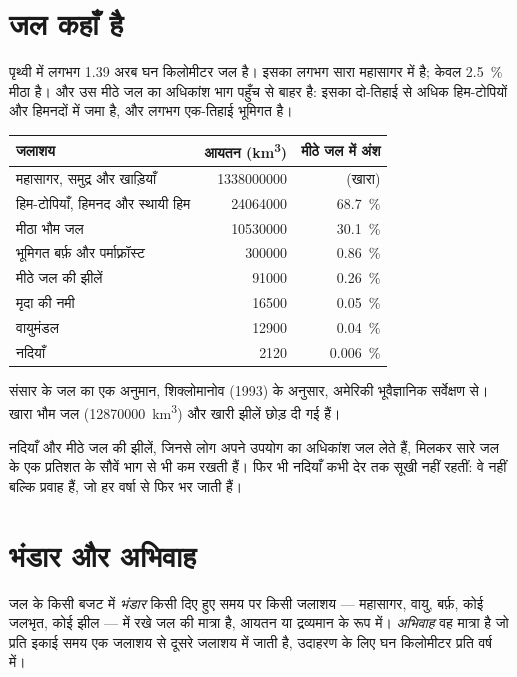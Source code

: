 \section{जल कहाँ है}

पृथ्वी में लगभग 1.39 अरब घन किलोमीटर जल है। इसका लगभग सारा
महासागर में है; केवल \qty{2.5}{\percent} मीठा है। और उस मीठे
जल का अधिकांश भाग पहुँच से बाहर है: इसका दो-तिहाई से अधिक हिम-टोपियों
और हिमनदों में जमा है, और लगभग एक-तिहाई भूमिगत है।

\begin{center}
\small
\begin{tabular}{|l|r|r|}
\hline
\textbf{जलाशय} & \textbf{आयतन (\unit{km^3})} & \textbf{मीठे जल में अंश} \\ \hline
महासागर, समुद्र और खाड़ियाँ & \num{1338000000} & (खारा) \\ \hline
हिम-टोपियाँ, हिमनद और स्थायी हिम & \num{24064000} & \qty{68.7}{\percent} \\ \hline
मीठा भौम जल & \num{10530000} & \qty{30.1}{\percent} \\ \hline
भूमिगत बर्फ़ और पर्माफ़्रॉस्ट & \num{300000} & \qty{0.86}{\percent} \\ \hline
मीठे जल की झीलें & \num{91000} & \qty{0.26}{\percent} \\ \hline
मृदा की नमी & \num{16500} & \qty{0.05}{\percent} \\ \hline
वायुमंडल & \num{12900} & \qty{0.04}{\percent} \\ \hline
नदियाँ & \num{2120} & \qty{0.006}{\percent} \\ \hline
\end{tabular}

{\small संसार के जल का एक अनुमान, शिक्लोमानोव (1993) के अनुसार, अमेरिकी
भूवैज्ञानिक सर्वेक्षण से। खारा भौम जल (\num{12870000}~\unit{km^3}) और
खारी झीलें छोड़ दी गई हैं।}
\end{center}

नदियाँ और मीठे जल की झीलें, जिनसे लोग अपने उपयोग का अधिकांश जल लेते हैं,
मिलकर सारे जल के एक प्रतिशत के सौवें भाग से भी कम रखती हैं। फिर भी
नदियाँ कभी देर तक सूखी नहीं रहतीं: वे  नहीं बल्कि प्रवाह हैं, जो हर
वर्षा से फिर भर जाती हैं।

\section{भंडार और अभिवाह}

\begin{definition}[भंडार; अभिवाह]\label{def:g10:freshwater-resources:stock}
जल के किसी बजट में \emph{भंडार} किसी दिए हुए समय पर किसी
जलाशय --- महासागर, वायु, बर्फ़, कोई जलभृत, कोई
झील --- में रखे जल की मात्रा है, आयतन या द्रव्यमान के रूप में।
\emph{अभिवाह} वह मात्रा है जो प्रति इकाई
समय एक जलाशय से दूसरे जलाशय में जाती है, उदाहरण के लिए घन किलोमीटर प्रति वर्ष में।
\end{definition}

